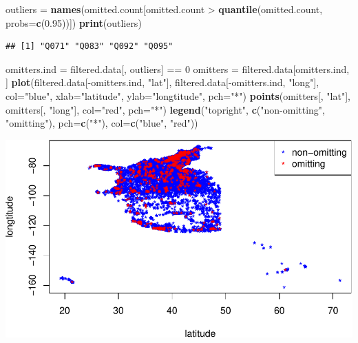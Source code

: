 \documentclass[]{article}
\newenvironment{Shaded}{\begin{snugshade}}{\end{snugshade}}
\newcommand{\KeywordTok}[1]{\textcolor[rgb]{0.13,0.29,0.53}{\textbf{{#1}}}}
\newcommand{\DataTypeTok}[1]{\textcolor[rgb]{0.13,0.29,0.53}{{#1}}}
\newcommand{\DecValTok}[1]{\textcolor[rgb]{0.00,0.00,0.81}{{#1}}}
\newcommand{\FloatTok}[1]{\textcolor[rgb]{0.00,0.00,0.81}{{#1}}}
\newcommand{\StringTok}[1]{\textcolor[rgb]{0.31,0.60,0.02}{{#1}}}
\newcommand{\NormalTok}[1]{{#1}}
\begin{document}
\begin{Shaded}
\begin{Highlighting}[]
\NormalTok{outliers =}\StringTok{ }\KeywordTok{names}\NormalTok{(omitted.count[omitted.count >}\StringTok{ }\KeywordTok{quantile}\NormalTok{(omitted.count, }\DataTypeTok{probs=}\KeywordTok{c}\NormalTok{(}\FloatTok{0.95}\NormalTok{))])}
\KeywordTok{print}\NormalTok{(outliers)}
\end{Highlighting}
\end{Shaded}

\begin{verbatim}
## [1] "Q071" "Q083" "Q092" "Q095"
\end{verbatim}

\begin{Shaded}
\begin{Highlighting}[]
\NormalTok{omitters.ind =}\StringTok{ }\NormalTok{filtered.data[, outliers] ==}\StringTok{ }\DecValTok{0}
\NormalTok{omitters =}\StringTok{ }\NormalTok{filtered.data[omitters.ind, ]}
\KeywordTok{plot}\NormalTok{(filtered.data[-omitters.ind, }\StringTok{"lat"}\NormalTok{], filtered.data[-omitters.ind, }\StringTok{"long"}\NormalTok{], }\DataTypeTok{col=}\StringTok{"blue"}\NormalTok{, }\DataTypeTok{xlab=}\StringTok{"latitude"}\NormalTok{, }\DataTypeTok{ylab=}\StringTok{"longtitude"}\NormalTok{, }\DataTypeTok{pch=}\StringTok{"*"}\NormalTok{)}
\KeywordTok{points}\NormalTok{(omitters[, }\StringTok{"lat"}\NormalTok{], omitters[, }\StringTok{"long"}\NormalTok{], }\DataTypeTok{col=}\StringTok{"red"}\NormalTok{, }\DataTypeTok{pch=}\StringTok{"*"}\NormalTok{)}
\KeywordTok{legend}\NormalTok{(}\StringTok{"topright"}\NormalTok{, }\KeywordTok{c}\NormalTok{(}\StringTok{"non-omitting"}\NormalTok{, }\StringTok{"omitting"}\NormalTok{), }\DataTypeTok{pch=}\KeywordTok{c}\NormalTok{(}\StringTok{"*"}\NormalTok{), }\DataTypeTok{col=}\KeywordTok{c}\NormalTok{(}\StringTok{"blue"}\NormalTok{, }\StringTok{"red"}\NormalTok{))}
\end{Highlighting}
\end{Shaded}

\includegraphics{./writeup_files/figure-latex/unnamed-chunk-2.pdf}
\end{document}
